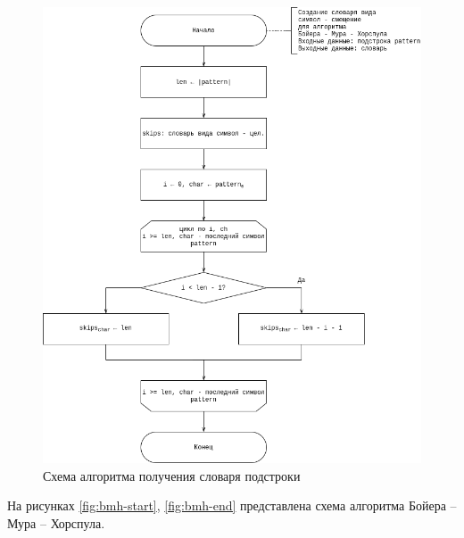 \begin{center}
	\begin{figure}[H]
		\centering
		\includegraphics[width=\linewidth]{assets/bmh_pipe-bmh-table.drawio.png}
		\caption{Схема алгоритма получения словаря подстроки}
		\label{fig:bmh-table}
	\end{figure}
\end{center}

На рисунках \ref{fig:bmh-start}, \ref{fig:bmh-end} представлена схема алгоритма Бойера -- Мура -- Хорспула.\newpage

